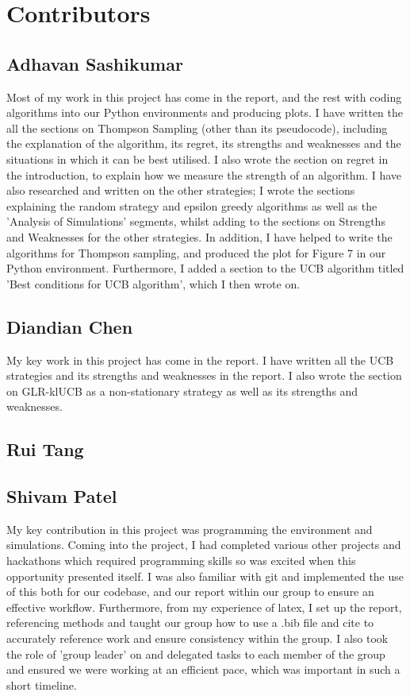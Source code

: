 \section{Contributors}\label{sec:contributors}

\subsection{Adhavan Sashikumar}\label{subsec:adhavan-sashikumar}
Most of my work in this project has come in the report, and the rest with coding algorithms into our Python environments and producing plots.
I have written the all the sections on Thompson Sampling (other than its pseudocode), including the explanation of the algorithm, its regret, its strengths and weaknesses and the situations in which it can be best utilised.
I also wrote the section on regret in the introduction, to explain how we measure the strength of an algorithm.
I have also researched and written on the other strategies;
I wrote the sections explaining the random strategy and epsilon greedy algorithms as well as the 'Analysis of Simulations' segments, whilst adding to the sections on Strengths and Weaknesses for the other strategies.
In addition, I have helped to write the algorithms for Thompson sampling, and produced the plot for Figure 7 in our Python environment.
Furthermore, I added a section to the UCB algorithm titled 'Best conditions for UCB algorithm', which I then wrote on.

\subsection{Diandian Chen}\label{subsec:diandian-chen}
My key work in this project has come in the report.
I have written all the UCB strategies and its strengths and weaknesses in the report.
I also wrote the section on GLR-klUCB as a non-stationary strategy as well as its strengths and weaknesses.

\subsection{Rui Tang}\label{subsec:rui-tang}

\subsection{Shivam Patel}\label{subsec:shivam-patel}
My key contribution in this project was programming the environment and simulations.
Coming into the project, I had completed various other projects and hackathons which required programming skills so was excited when this opportunity presented itself.
I was also familiar with git and implemented the use of this both for our codebase, and our report within our group to ensure an effective workflow.
Furthermore, from my experience of latex, I set up the report, referencing methods and taught our group how to use a .bib file and cite to accurately reference work and ensure consistency within the group.
I also took the role of 'group leader' on and delegated tasks to each member of the group and ensured we were working at an efficient pace, which was important in such a short timeline.

